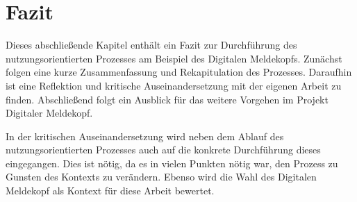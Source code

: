 \chapter{Fazit}

Dieses abschließende Kapitel enthält ein Fazit zur Durchführung des nutzungsorientierten Prozesses am Beispiel des Digitalen Meldekopfs.
Zunächst folgen eine kurze Zusammenfassung und Rekapitulation des Prozesses.
Daraufhin ist eine Reflektion und kritische Auseinandersetzung mit der eigenen Arbeit zu finden.
Abschließend folgt ein Ausblick für das weitere Vorgehen im Projekt Digitaler Meldekopf.

In der kritischen Auseinandersetzung wird neben dem Ablauf des nutzungsorientierten Prozesses auch auf die konkrete Durchführung dieses eingegangen.
Dies ist nötig, da es in vielen Punkten nötig war, den Prozess zu Gunsten des Kontexts zu verändern.
Ebenso wird die Wahl des Digitalen Meldekopf als Kontext für diese Arbeit bewertet.